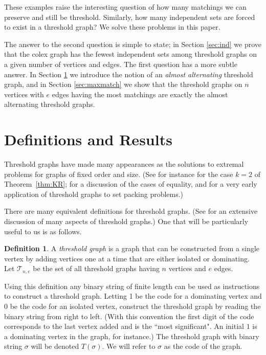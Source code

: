 \documentclass[12pt]{amsart}
\theoremstyle{plain}
\theoremstyle{definition}
\newtheorem{defi}[thm]{Definition}
\newcommand{\cT}{\mathcal{T}}
\begin{document}
These examples raise the interesting question of how many matchings we can preserve and still be threshold. Similarly, how many independent sets are forced to exist in a threshold graph? We solve these problems in this paper.

The answer to the second question is simple to state; in Section \ref{sec:ind} we prove that the colex graph has the fewest independent sets among threshold graphs on a given number of vertices and edges. The first question has a more subtle answer. In Section \ref{sec:results} we introduce the notion of an \emph{almost alternating} threshold graph, and in Section \ref{sec:maxmatch} we show that the threshold graphs on $n$ vertices with $e$ edges having the most matchings are exactly the almost alternating threshold graphs.  



\section{Definitions and Results}\label{sec:results}

Threshold graphs have made many  appearances as the solutions to extremal problems for graphs of fixed order and size. (See for instance \cite{KatonaAhlswede} for the case $k=2$ of Theorem~\ref{thm:KR}; \cite{PeledEtAl} for  a discussion of the cases  of equality, and \cite{ChHam} for a very early application of threshold graphs to set packing problems.) 

There are many equivalent definitions for threshold graphs. (See \cite{OrangeBook} for an extensive discussion of many aspects of threshold graphs.)  One that will be particularly useful to us is as follows.  
\begin{defi}
A \emph{threshold graph} is a graph that can be constructed from a single vertex by adding vertices one at a time that are either isolated or dominating.  Let $\cT_{n,e}$ be the set of all threshold graphs having $n$ vertices and $e$ edges.
\end{defi}

Using this definition any binary string of finite length can be used as instructions to construct a threshold graph.  Letting 1 be the code for a dominating vertex and  0 be the code for an isolated vertex, construct the threshold graph by reading the binary string from right to left.  (With this convention the first digit of the code corresponds to the last vertex added and is the ``most significant".  An initial $1$ is a dominating vertex in the graph, for instance.) The threshold graph with binary string $\sigma$ will be denoted $T(\sigma)$.  We will refer to $\sigma$ as the code of the graph.
\end{document}

